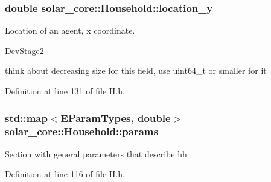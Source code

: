 \hypertarget{classsolar__core_1_1_household_a1ba6b7af82982096e05d99a70a2647eb}{}
\subsubsection[{location\+\_\+y}]{\setlength{\rightskip}{0pt plus 5cm}double solar\+\_\+core\+::\+Household\+::location\+\_\+y\hspace{0.3cm}{\ttfamily [protected]}}\label{classsolar__core_1_1_household_a1ba6b7af82982096e05d99a70a2647eb}
Location of an agent, x coordinate.\begin{DoxyRefDesc}{Dev\+Stage2}
\item[\hyperlink{_dev_stage2__DevStage2000004}{Dev\+Stage2}]think about decreasing size for this field, use uint64\+\_\+t or smaller for it \end{DoxyRefDesc}


Definition at line 131 of file H.\+h.

\hypertarget{classsolar__core_1_1_household_a41d61dc3bab971cb19170341b77d9df8}{}
\subsubsection[{params}]{\setlength{\rightskip}{0pt plus 5cm}std\+::map$<${\bf E\+Param\+Types}, double$>$ solar\+\_\+core\+::\+Household\+::params\hspace{0.3cm}{\ttfamily [protected]}}\label{classsolar__core_1_1_household_a41d61dc3bab971cb19170341b77d9df8}
Section with general parameters that describe hh 

Definition at line 116 of file H.\+h.

\hypertarget{classsolar__core_1_1_household_a297842358a2d79db160566106972bc0d}{}
